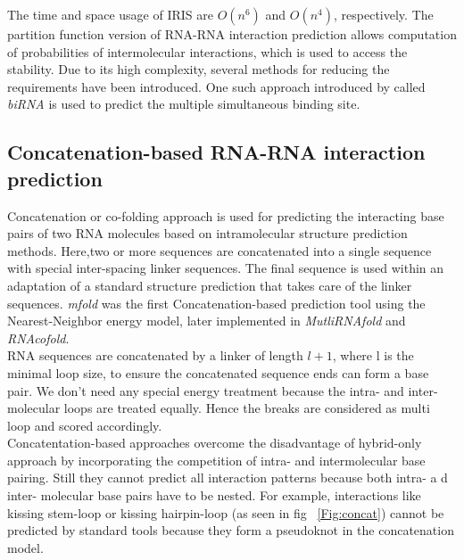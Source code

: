\documentclass[twoside,a4paper]{report}
\begin{document}
	The time and space usage of IRIS are $ O(n^6)$ and $ O(n^4)$, respectively. The partition function version of RNA-RNA interaction prediction allows computation of probabilities of intermolecular interactions, which is used to access the stability. Due to its high complexity, several methods for reducing the requirements have been introduced. One such approach introduced by \citet{ chitsaz2009birna} called \textit{biRNA} is used to predict the multiple simultaneous binding site. \\
	
	 
	\subsection{Concatenation-based RNA-RNA interaction prediction}
	Concatenation or co-folding approach is used for predicting the interacting base pairs of two RNA molecules based on intramolecular structure prediction methods. Here,two or more sequences are concatenated  into a single sequence with special inter-spacing linker sequences. The final sequence is used within an adaptation of a standard structure prediction that takes  care of the linker sequences. \textit{mfold} was the first Concatenation-based prediction tool using the Nearest-Neighbor energy model, later implemented in \textit{MutliRNAfold} and \textit{RNAcofold}.\\

	
	 RNA sequences are concatenated by a linker of length $l+1$, where l is the minimal loop size, to ensure the concatenated sequence ends can form a base pair. We don't need any special energy treatment because the intra- and inter- molecular loops are treated equally. Hence the breaks are considered as multi loop and scored accordingly. \\
		
	Concatentation-based approaches overcome the disadvantage of hybrid-only approach by incorporating the competition of intra- and intermolecular base pairing. Still they cannot predict all interaction patterns because both intra- a d inter- molecular base pairs have to be nested. For example, interactions like kissing stem-loop or kissing hairpin-loop (as seen in fig ~\ref{Fig:concat}) cannot be predicted by standard tools because they form a pseudoknot in the concatenation model. \\
	
\end{document}
